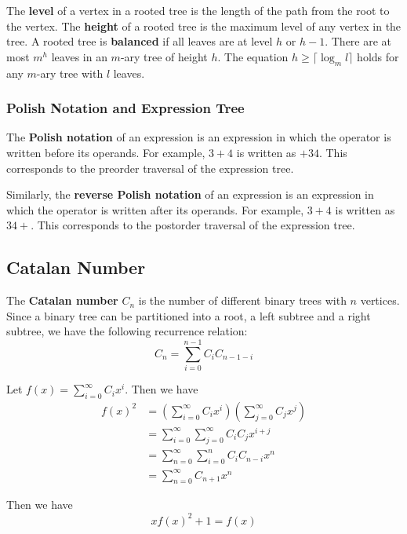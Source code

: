 \documentclass[a4paper,12pt]{article}
\begin{document}
The \textbf{level} of a vertex in a rooted tree is the length of the path from the root to the vertex.
The \textbf{height} of a rooted tree is the maximum level of any vertex in the tree.
A rooted tree is \textbf{balanced} if all leaves are at level $h$ or $h-1$.
There are at most $m^h$ leaves in an $m$-ary tree of height $h$.
The equation $h \geq \lceil \log_m l \rceil$ holds for any $m$-ary tree with $l$ leaves.

\subsubsection{Polish Notation and Expression Tree}

The \textbf{Polish notation} of an expression is an expression in which the operator is written before its operands.
For example, $3 + 4$ is written as $+ 3 4$.
This corresponds to the preorder traversal of the expression tree.

Similarly, the \textbf{reverse Polish notation} of an expression is an expression in which the operator is written after its operands.
For example, $3 + 4$ is written as $3 4 +$.
This corresponds to the postorder traversal of the expression tree.

\subsection{Catalan Number}

The \textbf{Catalan number} $C_n$ is the number of different binary trees with $n$ vertices.
Since a binary tree can be partitioned into a root, a left subtree and a right subtree, we have the following recurrence relation:
\begin{equation*}
	C_n = \sum_{i=0}^{n-1} C_i C_{n-1-i}
\end{equation*}

Let $f(x) = \sum_{i=0}^{\infty} C_i x^i$.
Then we have
\begin{align*}
	f(x)^2 &= \left( \sum_{i=0}^{\infty} C_i x^i \right) \left( \sum_{j=0}^{\infty} C_j x^j \right) \\
	&= \sum_{i=0}^{\infty} \sum_{j=0}^{\infty} C_i C_j x^{i+j} \\
	&= \sum_{n=0}^{\infty} \sum_{i=0}^{n} C_i C_{n-i} x^n \\
	&= \sum_{n=0}^{\infty} C_{n+1} x^n
\end{align*}

Then we have
\begin{equation*}
	xf(x)^2 + 1 = f(x)
\end{equation*}
\end{document}
